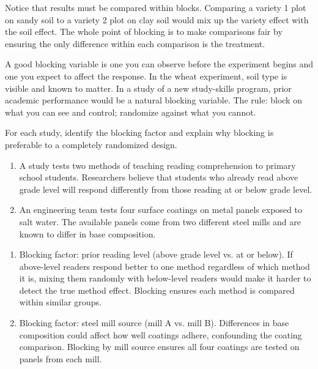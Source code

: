 Notice that results must be compared within blocks. Comparing a variety 1 plot on sandy soil to a variety 2 plot on clay soil would mix up the variety effect with the soil effect. The whole point of blocking is to make comparisons fair by ensuring the only difference within each comparison is the treatment.

A good blocking variable is one you can observe before the experiment begins and one you expect to affect the response. In the wheat experiment, soil type is visible and known to matter. In a study of a new study-skills program, prior academic performance would be a natural blocking variable. The rule: block on what you can see and control; randomize against what you cannot.

\begin{Exercise}[title={Identifying the Block Design}, label={ex:block-id}]
For each study, identify the blocking factor and explain why blocking is preferable to a completely randomized design.

\begin{enumerate} 
    \item A study tests two methods of teaching reading comprehension to primary school students. Researchers believe that students who already read above grade level will respond differently from those reading at or below grade level.
    \item An engineering team tests four surface coatings on metal panels exposed to salt water. The available panels come from two different steel mills and are known to differ in base composition.
\end{enumerate}
\end{Exercise}
\begin{Answer}[ref={ex:block-id}]
\begin{enumerate} 
    \item Blocking factor: prior reading level (above grade level vs. at or below). If above-level readers respond better to one method regardless of which method it is, mixing them randomly with below-level readers would make it harder to detect the true method effect. Blocking ensures each method is compared within similar groups.
    \item Blocking factor: steel mill source (mill A vs. mill B). Differences in base composition could affect how well coatings adhere, confounding the coating comparison. Blocking by mill source ensures all four coatings are tested on panels from each mill.
\end{enumerate}
\end{Answer}

